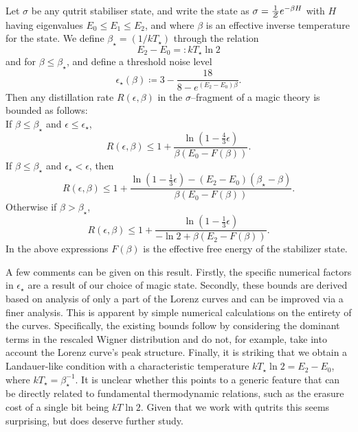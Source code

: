 \documentclass[pra,
aps,
twocolumn,
superscriptaddress,
groupedaddress,
nofootinbib,
reprint
]{revtex4-1}
\begin{document}
\begin{theorem}\label{thm:stab_bounds}
	Let $\sigma$ be any qutrit stabiliser state, and write the state as $\sigma = \frac{1}{\mathcal{Z}} e^{-\beta H}$ with $H$ having eigenvalues $E_0 \le E_1 \le E_2$, and where $\beta$ is an effective inverse temperature for the state. 
We define $\beta_\star = (1/kT_\star)$ through the relation
\begin{equation}
	E_2 - E_0 =: kT_\star \ln{2}
\end{equation}
and for $\beta \leq \beta_\star$, and define a threshold noise level
\begin{equation}
	\epsilon_{\star}(\beta) \coloneqq 3 - \dfrac{18}{8-e^{(E_2 - E_0)\beta}}.
\end{equation}
Then any distillation rate $R(\epsilon, \beta)$ in the $\sigma$--fragment of a magic theory is bounded as follows:\\
If $\beta \leq \beta_{\star}$ and $\epsilon  \leq \epsilon_{\star}$,
\begin{equation}
	R(\epsilon,\beta) \leq 1 + \frac{\ln{\left( 1 - \frac{4}{3}\epsilon \right)}}{\beta (E_0 - F(\beta))}.
\end{equation}
If $\beta \leq \beta_{\star}$ and $\epsilon_{\star} < \epsilon$, then
\begin{equation}
	R(\epsilon, \beta) \le 1 + \frac{\ln{\left(1-\frac{1}{3}\epsilon \right)} - (E_2 - E_0)(\beta_{\star} - \beta)}{\beta (E_0 - F(\beta))}.
\end{equation}
Otherwise if $\beta > \beta_{\star}$,
\begin{equation}
	R(\epsilon, \beta) \leq  1+ \frac{\ln{\left(1-\frac{1}{3}\epsilon \right)}}{-\ln{2} + \beta (E_2 - F(\beta))}.
\end{equation}
In the above expressions $F(\beta)$ is the effective free energy of the stabilizer state.
\end{theorem}
A few comments can be given on this result. 
Firstly, the specific numerical factors in $\epsilon_\star$ are a result of our choice of magic state. 
Secondly, these bounds are derived based on analysis of only a part of the Lorenz curves and can be improved via a finer analysis. 
This is apparent by simple numerical calculations on the entirety of the curves.
Specifically, the existing bounds follow by considering the dominant terms in the rescaled Wigner distribution and do not, for example, take into account the Lorenz curve's peak structure. 
Finally, it is striking that we obtain a Landauer-like condition with a characteristic temperature $kT_\star \ln 2 = E_2 - E_0$, where $kT_\star = \beta_\star^{-1}$. 
It is unclear whether this points to a generic feature that can be directly related to fundamental thermodynamic relations, such as the erasure cost of a single bit being $kT \ln 2$. 
Given that we work with qutrits this seems surprising, but does deserve further study.
\end{document}
